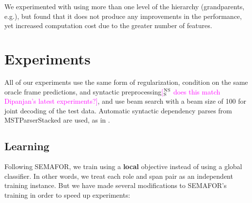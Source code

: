 \documentclass[11pt,a4paper]{article}
\newcommand{\ensuretext}[1]{#1}
\newcommand{\nssmarker}{\ensuretext{\textcolor{magenta}{\ensuremath{^{\textsc{NS}}_{\textsc{S}}}}}}
\newcommand{\stmarker}{\ensuretext{\textcolor{blue}{\ensuremath{^{\textsc{S}}_{\textsc{T}}}}}}
\newcommand{\arkcomment}[3]{\ensuretext{\textcolor{#3}{[#1 #2]}}}
\newcommand{\nss}[1]{\arkcomment{\nssmarker}{#1}{magenta}}
\newcommand{\st}[1]{\arkcomment{\stmarker}{#1}{blue}}
\newcommand{\term}[1]{\textbf{#1}} %
\begin{document}
We experimented with using more than one level of the hierarchy (grandparents, e.g.), but found that it does not produce any improvements in the performance, yet increased computation cost due to the greater number of features.



\section{Experiments}

All of our experiments use the same form of regularization, 
condition on the same oracle frame predictions, 
and syntactic preprocessing\nss{does this match Dipanjan's latest experiments?}, 
and use beam search with a beam size of 100 for joint decoding of the test data.
Automatic syntactic dependency parses from MSTParserStacked \citep{martins-08} are used, as in \cite{das-14}. %


\subsection{Learning}
\label{sec:learning}

Following SEMAFOR, we train using a \term{local} objective instead of using a global classifier.
In other words, we treat each role and span pair as an independent training instance.
%
But we have made several modifications to SEMAFOR's training in order to speed up experiments:
\end{document}
